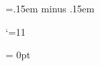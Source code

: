 \newskip\thinshrinkable
\skip\thinshrinkable=.15em minus .15em

\newbox\entryindexbox
\def\insertindexentrybox{%
\lineskip=0pt    %
\box\entryindexbox}

\let\entryorphanpenalty\egroup

\long\def\indexorphanpenalty{%
  \def\isentry{\entry}%
  \ifx\firsttoken\isentry
  \else
    \unskip\penalty 9000
  \fi
  \egroup %
}

\def\indexdotfill{\cleaders
  \hbox{$\mathsurround=0pt \mkern1.5mu.\mkern1.5mu$}\hskip 1em plus 1filll}


\def\primary #1{\line{#1\hfil}}

\newskip\secondaryindent \secondaryindent=0.5cm
\def\secondary#1#2{{%
  \parfillskip=0in
  \parskip=0in
  \hangindent=1in
  \hangafter=1
  \noindent\hskip\secondaryindent\hbox{#1}\indexdotfill
  \ifpdf
    \pdfgettoks#2.\ \the\toksA %
  \else
    #2
  \fi
  \par
}}

\catcode`\@=11

\newbox\partialpage
\newdimen\doublecolumnhsize
\newdimen\doublecolumntopgap
\doublecolumntopgap = 0pt

\newtoks\savedtopmark %
\newtoks\savedfirstmark

